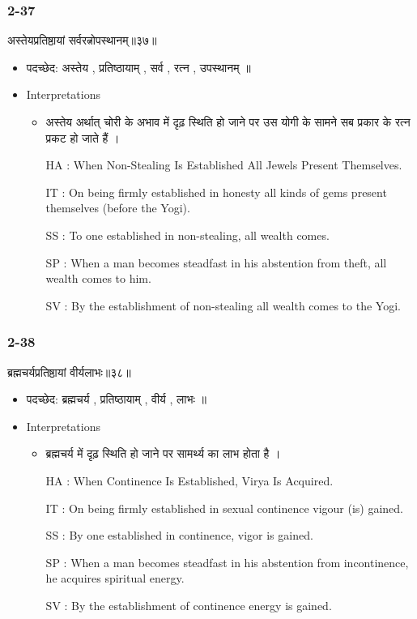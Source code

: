 \begin{frame}[fragile]\frametitle{2-37}
\begin{sanskrit}
अस्तेयप्रतिष्ठायां सर्वरत्नोपस्थानम्॥३७॥
\end{sanskrit}

	\begin{itemize}
	\item पदच्छेद: अस्तेय , प्रतिष्ठायाम् , सर्व , रत्न , उपस्थानम् ॥
	\item Interpretations
		\begin{itemize}
		\item अस्तेय अर्थात् चोरी के अभाव में दृढ़ स्थिति हो जाने पर उस योगी के सामने सब प्रकार के रत्न प्रकट हो जाते हैं ।
		\item [HA]: When Non-Stealing Is Established All Jewels Present Themselves.
		\item [IT]: On being firmly established in honesty all kinds of gems present themselves (before the Yogi).
		\item [SS]: To one established in non-stealing, all wealth comes.
		\item [SP]: When a man becomes steadfast in his abstention from theft, all wealth comes to him.
		\item [SV]: By the establishment of non-stealing all wealth comes to the Yogi. 
		\end{itemize}
	\end{itemize}	
\end{frame}


\begin{frame}[fragile]\frametitle{2-38}
\begin{sanskrit}
ब्रह्मचर्यप्रतिष्ठायां वीर्यलाभः॥३८॥
\end{sanskrit}

	\begin{itemize}
	\item पदच्छेद: ब्रह्मचर्य , प्रतिष्ठायाम् , वीर्य , लाभः ॥
	\item Interpretations
		\begin{itemize}
		\item ब्रह्मचर्य में दृढ़ स्थिति हो जाने पर सामर्थ्य का लाभ होता है ।
		\item [HA]: When Continence Is Established, Virya Is Acquired.
		\item [IT]: On being firmly established in sexual continence vigour (is) gained.
		\item [SS]: By one established in continence, vigor is gained.
		\item [SP]: When a man becomes steadfast in his abstention from incontinence, he acquires spiritual energy.
		\item [SV]: By the establishment of continence energy is gained. 
		\end{itemize}
	\end{itemize}	
\end{frame}


